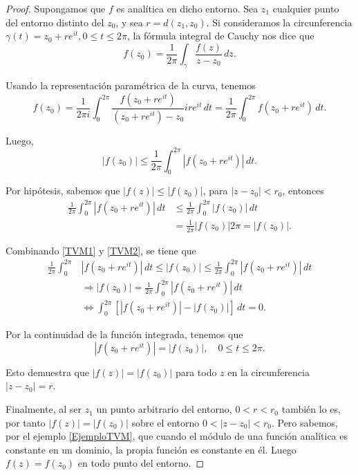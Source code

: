 \begin{proof}
Supongamos que $f$ es analítica en dicho entorno. Sea $z_1$ cualquier punto del entorno distinto del $z_0$, y sea $r = d(z_1,z_0)$. Si consideramos la circunferencia $\gamma(t) = z_0 + re^{it}, 0 \leq t \leq 2\pi$, la fórmula integral de Cauchy nos dice que 
$$f(z_0) = \frac{1}{2\pi} \int_{\gamma} \frac{f(z)}{z-z_0} \,dz.$$

Usando la representación paramétrica de la curva, tenemos
$$
f(z_0) = \frac{1}{2\pi i} \int_0^{2\pi} \frac{f\left(z_0 +  re^{it}\right)}{(z_0 +  re^{it}) - z_0} i r e^{it} \,dt = \frac{1}{2\pi} \int_0^{2\pi} f(z_0 +  re^{it})\,dt.   
$$

Luego,
\begin{equation}
|f(z_0)| \leq \frac{1}{2\pi} \int_0^{2\pi} \left|f\left(z_0 +  re^{it}\right) \right| \,dt.    \label{TVM1}
\end{equation}

Por hipótesis, sabemos que $|f(z)| \leq |f(z_0)|$, para $|z-z_0| < r_0$, entonces
\begin{align}
 \frac{1}{2\pi} \int_0^{2\pi} \left|f\left(z_0 +  re^{it}\right) \right| \,dt &\leq   \frac{1}{2\pi} \int_0^{2\pi} |f(z_0)|\,dt \nonumber \\
 &= \frac{1}{2\pi} |f(z_0)| 2\pi = |f(z_0)|. \label{TVM2}
\end{align}

Combinando \eqref{TVM1} y \eqref{TVM2}, se tiene que 
\begin{align*}
   \frac{1}{2\pi} \int_0^{2\pi} & \left|f\left(z_0 +  re^{it}\right) \right| \,dt \leq |f(z_0)| \leq \frac{1}{2\pi} \int_0^{2\pi} \left|f\left(z_0 +  re^{it}\right) \right| \,dt \\
  &\Rightarrow |f(z_0)| = \frac{1}{2\pi} \int_0^{2\pi} \left|f\left(z_0 +  re^{it}\right) \right| \,dt \\
   &\Leftrightarrow \int_0^{2\pi} \left[ \left| f(z_0 + re^{it}) \right| - |f(z_0)|\right] \,dt = 0. 
\end{align*}

Por la continuidad de la función integrada, tenemos que 
$$|f(z_0 + re^{it})| = |f(z_0)|, \quad 0 \leq t \leq 2\pi.$$

Esto demuestra que $|f(z)| = |f(z_0)|$ para todo $z$ en la circunferencia $|z-z_0| = r$.

Finalmente, al ser $z_1$ un punto arbitrario del entorno, $0 <r <r_0$ también lo es, por tanto $|f(z)| = |f(z_0)|$ sobre el entorno $0 < |z-z_0| < r_0$. Pero sabemos, por el ejemplo \ref{EjemploTVM}, que cuando el módulo de una función analítica es constante en un dominio, la propia función es constante en él. Luego $f(z) = f(z_0)$ en todo punto del entorno.
\end{proof}

